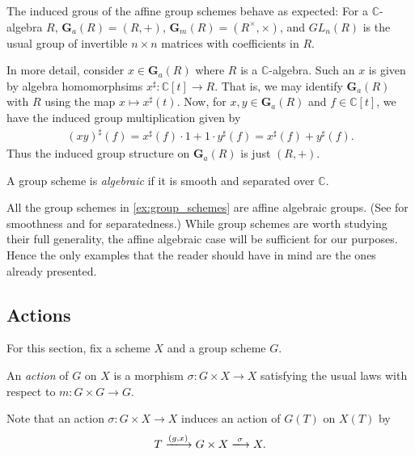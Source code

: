 \documentclass[12pt]{ociamthesis}  %
\begin{document}
\begin{example}
  The induced grous of the affine group schemes behave as expected:
  For a $\mathbb{C}$-algebra $R$, $\mathbf{G}_a(R) = (R,+)$,
  $\mathbf{G}_m(R) = (R^\times,\times)$, and
  $GL_n(R)$ is the usual group of invertible $n\times n$ matrices
  with coefficients in $R$.

  In more detail, consider $x\in\mathbf{G}_a(R)$ where $R$ is
  a $\mathbb{C}$-algebra. Such an $x$ is given by algebra homomorphsims
  $x^\sharp:\mathbb{C}[t] \to R$. That is, we may identify
  $\mathbf{G}_a(R)$ with $R$ using the map $x \mapsto x^\sharp(t)$. Now,
  for $x,y\in\mathbf{G}_a(R)$ and $f\in \mathbb{C}[t]$, we have the
  induced group multiplication given by
  \begin{align*}
    (xy)^\sharp(f)
    = x^\sharp(f) \cdot 1 + 1 \cdot y^\sharp(f)
    = x^\sharp(f) + y^\sharp(f).
  \end{align*}
  Thus the induced group structure on $\mathbf{G}_a(R)$ is just $(R,+)$.
\end{example}

\begin{definition}
  A group scheme is \emph{algebraic} if it is smooth and separated
  over $\mathbb{C}$.
\end{definition}

\begin{example}
  All the group schemes in \ref{ex:group_schemes} are affine algebraic
  groups. (See \cite[IV Theorem 9,3]{milne2012} for smoothness
  and \cite[Remark 3.2]{hoskins2016} for separatedness.) While group
  schemes are worth studying their full generality, the affine algebraic
  case will be sufficient for our purposes. Hence the only examples
  that the reader should have in mind are the ones already presented.
\end{example}

\subsection{Actions}

For this section, fix a scheme $X$ and a group scheme $G$.

\begin{definition}
  An \emph{action} of $G$ on $X$ is a morphism
  $\sigma : G\times X\to X$ satisfying the usual laws with respect
  to $m:G\times G\to G$.
\end{definition}

Note that an action $\sigma : G\times X\to X$ induces an action of
$G(T)$ on $X(T)$ by
\begin{equation*}
  T \xlongrightarrow{(g,x)} G\times X \xlongrightarrow{\sigma} X.
\end{equation*}
\end{document}
